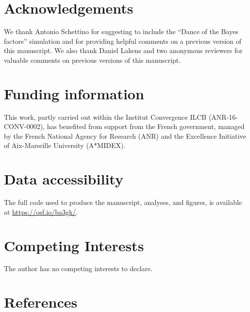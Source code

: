 \documentclass[
  man, donotrepeattitle,floatsintext]{apa6}
\begin{document}
\hypertarget{acknowledgements}{%
\section*{Acknowledgements}\label{acknowledgements}}

We thank Antonio Schettino for suggesting to include the ``Dance of the Bayes factors'' simulation and for providing helpful comments on a previous version of this manuscript. We also thank Daniel Lakens and two anonymous reviewers for valuable comments on previous versions of this manuscript.

\hypertarget{funding-information}{%
\section{Funding information}\label{funding-information}}

This work, partly carried out within the Institut Convergence ILCB (ANR-16-CONV-0002), has benefited from support from the French government, managed by the French National Agency for Research (ANR) and the Excellence Initiative of Aix-Marseille University (A*MIDEX).

\hypertarget{supp}{%
\section{Data accessibility}\label{supp}}

The full code used to produce the manuscript, analyses, and figures, is available at \url{https://osf.io/ba3gk/}.

\hypertarget{competing-interests}{%
\section{Competing Interests}\label{competing-interests}}

The author has no competing interests to declare.

\hypertarget{references}{%
\section*{References}\label{references}}
\end{document}

